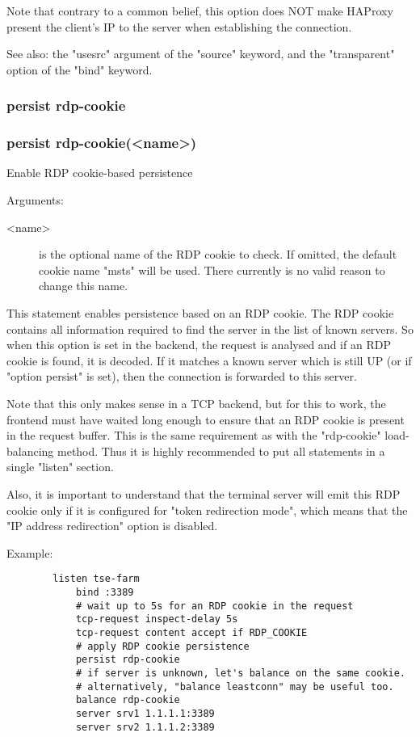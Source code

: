   Note that contrary to a common belief, this option does NOT make HAProxy
  present the client's IP to the server when establishing the connection.

  See also: the "usesrc" argument of the "source" keyword, and the
            "transparent" option of the "bind" keyword.

\subsubsection{persist rdp-cookie}
\subsubsection*{persist rdp-cookie(<name>)}


  Enable RDP cookie-based persistence


  Arguments:
  \begin{description}
  \item[<name>] is the optional name of the RDP cookie to check. If omitted, the
              default cookie name "msts" will be used. There currently is no
              valid reason to change this name.
  \end{description}

  This statement enables persistence based on an RDP cookie. The RDP cookie
  contains all information required to find the server in the list of known
  servers. So when this option is set in the backend, the request is analysed
  and if an RDP cookie is found, it is decoded. If it matches a known server
  which is still UP (or if "option persist" is set), then the connection is
  forwarded to this server.

  Note that this only makes sense in a TCP backend, but for this to work, the
  frontend must have waited long enough to ensure that an RDP cookie is present
  in the request buffer. This is the same requirement as with the "rdp-cookie"
  load-balancing method. Thus it is highly recommended to put all statements in
  a single "listen" section.

  Also, it is important to understand that the terminal server will emit this
  RDP cookie only if it is configured for "token redirection mode", which means
  that the "IP address redirection" option is disabled.

  Example:
  \begin{verbatim}
        listen tse-farm
            bind :3389
            # wait up to 5s for an RDP cookie in the request
            tcp-request inspect-delay 5s
            tcp-request content accept if RDP_COOKIE
            # apply RDP cookie persistence
            persist rdp-cookie
            # if server is unknown, let's balance on the same cookie.
            # alternatively, "balance leastconn" may be useful too.
            balance rdp-cookie
            server srv1 1.1.1.1:3389
            server srv2 1.1.1.2:3389
  \end{verbatim}

